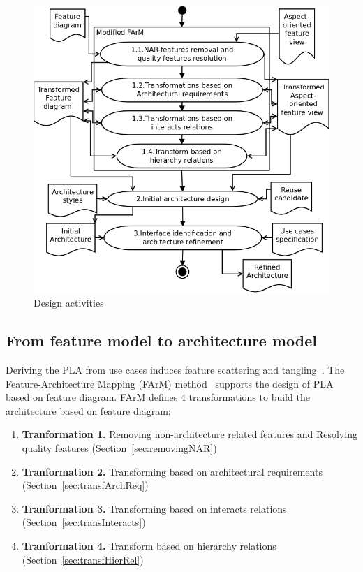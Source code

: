 \documentclass[11pt,twoside]{article}
\begin{document}
\begin{figure}[!htb]
   \centering
   \includegraphics[scale=0.3]{figs/design-v01.png}
   \caption{Design activities}
   \label{fig:design}
\end{figure}



\subsection{From feature model to architecture model}
\label{sec:farm}

Deriving the PLA from use cases induces feature scattering and tangling~\cite{Sochos:2006:FAM}. The Feature-Architecture Mapping (FArM)
method~\cite{Sochos:2006:FAM} supports the design of PLA based on feature diagram. FArM defines 4 transformations to build the architecture
based on feature diagram: 

\begin{enumerate}
\item \textbf{Tranformation 1.} Removing non-architecture related features  and Resolving quality features (Section~\ref{sec:removingNAR})
\item \textbf{Tranformation 2.} Transforming based on architectural requirements (Section~\ref{sec:transfArchReq})
\item \textbf{Tranformation 3.} Transforming based on interacts relations (Section~\ref{sec:transInteracts})
\item \textbf{Tranformation 4.} Transform based on hierarchy relations (Section~\ref{sec:transfHierRel})
\end{enumerate}
\end{document}
